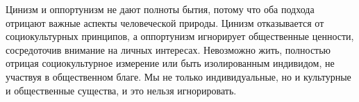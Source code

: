
Цинизм и оппортунизм не дают полноты бытия, потому что оба подхода отрицают важные аспекты человеческой природы. Цинизм отказывается от социокультурных принципов, а оппортунизм игнорирует общественные ценности, сосредоточив внимание на личных интересах. Невозможно жить, полностью отрицая социокультурное измерение или быть изолированным индивидом, не участвуя в общественном благе. Мы не только индивидуальные, но и культурные и общественные существа, и это нельзя игнорировать.


